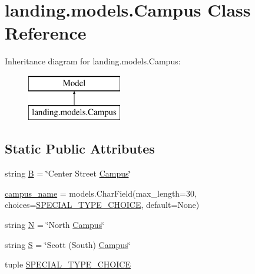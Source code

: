 \hypertarget{classlanding_1_1models_1_1Campus}{}\section{landing.\+models.\+Campus Class Reference}
\label{classlanding_1_1models_1_1Campus}
Inheritance diagram for landing.\+models.\+Campus\+:\begin{figure}[H]
\begin{center}
\leavevmode
\includegraphics[height=2.000000cm]{classlanding_1_1models_1_1Campus}
\end{center}
\end{figure}
\subsection*{Static Public Attributes}
\begin{DoxyCompactItemize}
\item 
string \mbox{\hyperlink{classlanding_1_1models_1_1Campus_a399e7a0a49e00f3989ddcb279895289d}{B}} = \char`\"{}Center Street \mbox{\hyperlink{classlanding_1_1models_1_1Campus}{Campus}}\char`\"{}
\item 
\mbox{\hyperlink{classlanding_1_1models_1_1Campus_ae04580bc0816bb0de3b83563393375f6}{campus\+\_\+name}} = models.\+Char\+Field(max\+\_\+length=30, choices=\mbox{\hyperlink{classlanding_1_1models_1_1Campus_a7db95941da37de92bae99b10b9cdda5e}{S\+P\+E\+C\+I\+A\+L\+\_\+\+T\+Y\+P\+E\+\_\+\+C\+H\+O\+I\+CE}}, default=None)
\item 
string \mbox{\hyperlink{classlanding_1_1models_1_1Campus_a98b80c86220f75dbb0ece45713d02e09}{N}} = \char`\"{}North \mbox{\hyperlink{classlanding_1_1models_1_1Campus}{Campus}}\char`\"{}
\item 
string \mbox{\hyperlink{classlanding_1_1models_1_1Campus_ad81ec129890560554391f01ce266beaa}{S}} = \char`\"{}Scott (South) \mbox{\hyperlink{classlanding_1_1models_1_1Campus}{Campus}}\char`\"{}
\item 
tuple \mbox{\hyperlink{classlanding_1_1models_1_1Campus_a7db95941da37de92bae99b10b9cdda5e}{S\+P\+E\+C\+I\+A\+L\+\_\+\+T\+Y\+P\+E\+\_\+\+C\+H\+O\+I\+CE}}
\end{DoxyCompactItemize}


